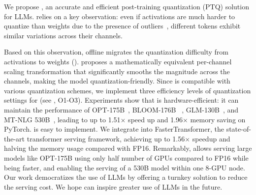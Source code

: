We propose \method, an accurate and efficient post-training quantization (PTQ) solution for LLMs.
\method relies on a key observation: even if activations are much harder to quantize than weights due to the presence of outliers~\cite{dettmers2022llmint8},  different tokens exhibit similar variations across their channels.

Based on this observation, \method offline migrates the quantization difficulty from activations to weights ().
\method proposes a mathematically equivalent per-channel scaling transformation that significantly smooths the magnitude across the channels, making the model quantization-friendly.
Since \method is compatible with various quantization schemes, we implement three efficiency levels of 
quantization settings for \method (see , O1-O3).
Experiments show that \method is hardware-efficient: it can maintain the performance of OPT-175B~\cite{opt}, BLOOM-176B~\cite{scao2022bloom} , GLM-130B~\cite{zeng2022glm}, and MT-NLG 530B~\cite{smith2022using},
leading to up to 1.51$\times$ speed up and 1.96$\times$ memory saving on PyTorch.
\method is easy to implement. We integrate \method into FasterTransformer, the state-of-the-art transformer serving framework, achieving up to 1.56$\times$ speedup and halving the memory usage compared with FP16.
Remarkably, \method allows serving large models like OPT-175B using only half number of GPUs compared to FP16 while being faster, and enabling the serving of a 530B model within one 8-GPU node.
Our work democratizes the use of LLMs by offering a turnkey solution to reduce the serving cost. We hope \method can inspire greater use of LLMs in the future.
